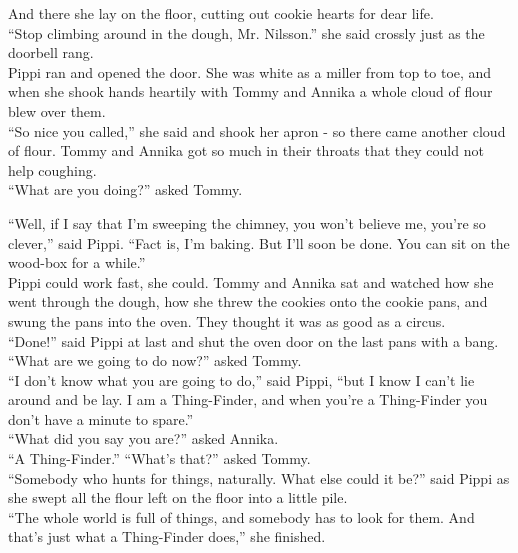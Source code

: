 \documentclass{standard}
\begin{document}
And there she lay on the floor, cutting out cookie hearts for dear life.\\

``Stop climbing around in the dough, Mr. Nilsson.” she said crossly just as the doorbell rang.\\

Pippi ran and opened the door. She was white as a miller from top to toe, and when she shook hands heartily with Tommy and Annika a whole cloud of flour blew over them.\\

``So nice you called,” she said and shook her apron - so there came another cloud of flour. Tommy and Annika got so much in their throats that they could not help coughing.\\

``What are you doing?” asked Tommy.

``Well, if I say that I’m sweeping the chimney, you won’t believe me, you’re so clever,” said Pippi. ``Fact is, I’m baking. But I’ll soon be done. You can sit on the wood-box for a while.”\\

Pippi could work fast, she could. Tommy and Annika sat and watched how she went through the dough, how she threw the cookies onto the cookie pans, and swung the pans into the oven. They thought it was as good as a circus.\\

``Done!” said Pippi at last and shut the oven door on the last pans with a bang. ``What are we going to do now?” asked Tommy.\\

``I don’t know what you are going to do,” said Pippi, ``but I know I can’t lie around and be lay. I am a Thing-Finder, and when you’re a Thing-Finder you don’t have a minute to spare.”\\

``What did you say you are?” asked Annika.\\

``A Thing-Finder.” ``What’s that?” asked Tommy.\\

``Somebody who hunts for things, naturally. What else could it be?” said Pippi as she swept all the flour left on the floor into a little pile.\\

``The whole world is full of things, and somebody has to look for them. And that’s just what a Thing-Finder does,” she finished.\\
\end{document}

